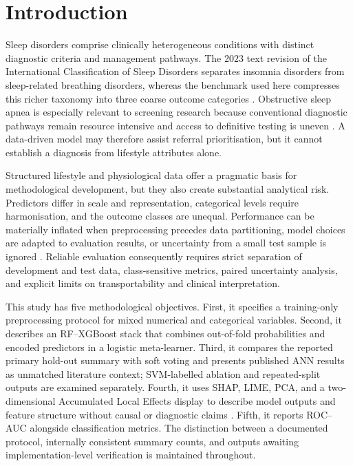 \documentclass[a4paper,fleqn]{cas-dc}
\begin{document}
\section{Introduction}
Sleep disorders comprise clinically heterogeneous conditions with distinct diagnostic criteria and management pathways. The 2023 text revision of the International Classification of Sleep Disorders separates insomnia disorders from sleep-related breathing disorders, whereas the benchmark used here compresses this richer taxonomy into three coarse outcome categories \cite{aasm2023}. Obstructive sleep apnea is especially relevant to screening research because conventional diagnostic pathways remain resource intensive and access to definitive testing is uneven \cite{korkalainen2024,giorgi2025,bazoukis2023}. A data-driven model may therefore assist referral prioritisation, but it cannot establish a diagnosis from lifestyle attributes alone.

Structured lifestyle and physiological data offer a pragmatic basis for methodological development, but they also create substantial analytical risk. Predictors differ in scale and representation, categorical levels require harmonisation, and the outcome classes are unequal. Performance can be materially inflated when preprocessing precedes data partitioning, model choices are adapted to evaluation results, or uncertainty from a small test sample is ignored \cite{kapoor2023,efthimiou2024,collins2024}. Reliable evaluation consequently requires strict separation of development and test data, class-sensitive metrics, paired uncertainty analysis, and explicit limits on transportability and clinical interpretation.

This study has five methodological objectives. First, it specifies a training-only preprocessing protocol for mixed numerical and categorical variables. Second, it describes an RF--XGBoost stack that combines out-of-fold probabilities and encoded predictors in a logistic meta-learner. Third, it compares the reported primary hold-out summary with soft voting and presents published ANN results as unmatched literature context; SVM-labelled ablation and repeated-split outputs are examined separately. Fourth, it uses SHAP, LIME, PCA, and a two-dimensional Accumulated Local Effects display to describe model outputs and feature structure without causal or diagnostic claims \cite{jung2023,allen2024,pesapane2026}. Fifth, it reports ROC--AUC alongside classification metrics. The distinction between a documented protocol, internally consistent summary counts, and outputs awaiting implementation-level verification is maintained throughout.
\end{document}
